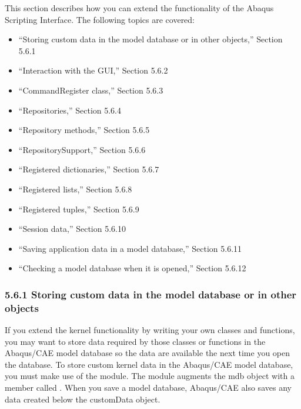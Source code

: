 \documentclass[letterpaper,10pt,english]{sphinxmanual}
\begin{document}
This section describes how you can extend the functionality of the Abaqus Scripting Interface. The following topics are covered:
\begin{itemize}
\item {} 
“Storing custom data in the model database or in other objects,” Section 5.6.1

\item {} 
“Interaction with the GUI,” Section 5.6.2

\item {} 
“CommandRegister class,” Section 5.6.3

\item {} 
“Repositories,” Section 5.6.4

\item {} 
“Repository methods,” Section 5.6.5

\item {} 
“RepositorySupport,” Section 5.6.6

\item {} 
“Registered dictionaries,” Section 5.6.7

\item {} 
“Registered lists,” Section 5.6.8

\item {} 
“Registered tuples,” Section 5.6.9

\item {} 
“Session data,” Section 5.6.10

\item {} 
“Saving application data in a model database,” Section 5.6.11

\item {} 
“Checking a model database when it is opened,” Section 5.6.12

\end{itemize}


\subsubsection{5.6.1 Storing custom data in the model database or in other objects}
\label{\detokenize{abq_script_guide:storing-custom-data-in-the-model-database-or-in-other-objects}}
If you extend the kernel functionality by writing your own classes and functions, you may want to store data required by those classes or functions in the Abaqus/CAE model database so the data are available the next time you open the database. To store custom kernel data in the Abaqus/CAE model database, you must make use of the  module. The  module augments the mdb object with a member called . When you save a model database, Abaqus/CAE also saves any data created below the customData object.
\end{document}
